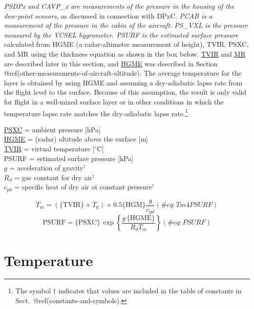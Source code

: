 \documentclass[
  english,
]{book}
\begin{document}
\emph{PSDPx and CAVP\_x are measurements of the pressure in the housing
of the dew-point sensors,} as discussed in connection with DPxC.
\emph{PCAB is a measurement of the pressure in the cabin of the
aircraft. PS\_VXL is the pressure measured by the VCSEL hygrometer.
PSURF is the estimated surface pressure} calculated from HGME (a
radar-altimeter measurement of height), TVIR, PSXC, and MR using the
thickness equation as shown in the box below.
\protect\hyperlink{TVIR}{TVIR} and \protect\hyperlink{MR}{MR} are
described later in this section, and \protect\hyperlink{HGME}{HGME} was
described in Section @ref(other-measurements-of-aircraft-altitude). The
average temperature for the layer is obtained by using HGME and assuming
a dry-adiabatic lapse rate from the flight level to the surface. Because
of this assumption, the result is only valid for flight in a well-mixed
surface layer or in other conditions in which the temperature lapse rate
matches the dry-adiabatic lapse rate.\footnote{The symbol {†} indicates
  that values are included in the table of constants in
  Sect.~@ref(constants-and-symbols).}

\protect\hyperlink{psx}{PSXC} = ambient pressure {[}hPa{]}\\
\href{./3-the-state-of-the-aircraft.html\#hgme-159}{HGME} = (radar)
altitude above the surface {[}m{]}\\
\protect\hyperlink{TVIR}{TVIR} = virtual temperature
{[}\(^{\circ}\mathrm{C}\){]}\\
PSURF = estimated surface pressure {[}hPa{]}\\
\(g\) = acceleration of gravity\(^{\dagger}\)\\
\(R_{d}\) = gas constant for dry air\(^{\dagger}\)\\
\(c_{pd}\) = specific heat of dry air at constant pressure\(^{\dagger}\)

\begin{equation}
T_{m}=(\mathrm{\{TVIR\}}+T_{0})+0.5\mathrm{\{HGM\}}\frac{g}{c_{pd}}
(\#eq:Tm4PSURF)
\end{equation} \begin{equation}
\mathrm{PSURF}=\mathrm{\{PSXC\}}\,\exp\left\{ \frac{g\,\{\mathrm{HGME}\}}{R_{d}T_{m}}\right\}
(\#eq:PSURF)
\end{equation}

\hypertarget{temperature-section}{%
\section{Temperature}\label{temperature-section}}
\end{document}
